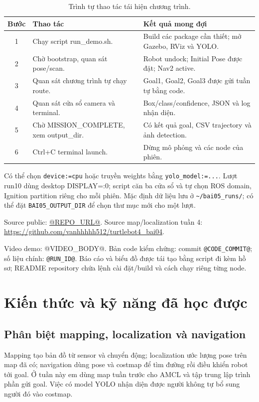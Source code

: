 \documentclass[a4paper,11pt]{article}
\newcommand{\code}[1]{\nolinkurl{#1}}
\begin{document}
\begin{table}[H]\centering\small
\begin{tabular}{@{}cp{7.0cm}p{8.1cm}@{}}\toprule
Bước & Thao tác & Kết quả mong đợi\\\midrule
1 & Chạy script run\_demo.sh. & Build các package cần thiết; mở Gazebo, RViz và YOLO.\\
2 & Chờ bootstrap, quan sát pose/scan. & Robot undock; Initial Pose được đặt; Nav2 active.\\
3 & Quan sát chương trình tự chạy route. & Goal1, Goal2, Goal3 được gửi tuần tự bằng code.\\
4 & Quan sát cửa sổ camera và terminal. & Box/class/confidence, JSON và log nhận diện.\\
5 & Chờ MISSION\_COMPLETE, xem output\_dir. & Có kết quả goal, CSV trajectory và ảnh detection.\\
6 & Ctrl+C terminal launch. & Dừng mô phỏng và các node của phiên.\\\bottomrule
\end{tabular}
\caption{Trình tự thao tác tái hiện chương trình.}
\end{table}

Có thể chọn \code{device:=cpu} hoặc truyền weights bằng \code{yolo_model:=...}.
Lượt run10 dùng desktop DISPLAY=:0; script căn ba cửa sổ và tự chọn ROS domain,
Ignition partition riêng cho mỗi phiên. Mặc định dữ liệu lưu ở \code{~/bai05_runs/};
có thể đặt \code{BAI05_OUTPUT_DIR} để chọn thư mục mới cho một lượt.

Source public: \url{@REPO_URL@}.
Source map/localization tuần 4: \url{https://github.com/vanhhhhh512/turtlebot4_bai04}.

Video demo: @VIDEO_BODY@.
Bản code kiểm chứng: commit \code{@CODE_COMMIT@}; số liệu chính: \code{@RUN_ID@}.
Báo cáo và biểu đồ được tái tạo bằng script đi kèm hồ sơ; README repository
chứa lệnh cài đặt/build và cách chạy riêng từng node.

\section{Kiến thức và kỹ năng đã học được}
\subsection{Phân biệt mapping, localization và navigation}

Mapping tạo bản đồ từ sensor và chuyển động; localization ước lượng pose trên map
đã có; navigation dùng pose và costmap để tìm đường rồi điều khiển robot tới goal.
Ở tuần này em dùng map tuần trước cho AMCL và tập trung lập trình phần gửi goal.
Việc có model YOLO nhận diện được người không tự bổ sung người đó vào costmap.
\end{document}
